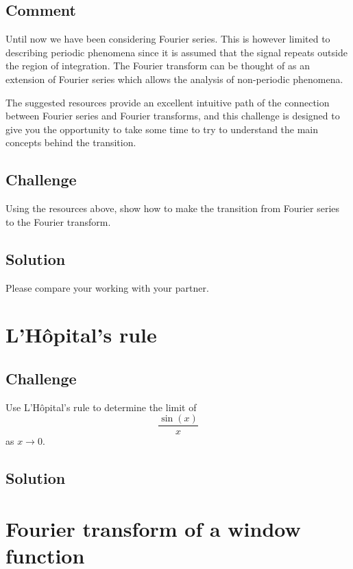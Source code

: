 \subsection*{Comment}
Until now we have been considering Fourier series. This is however limited to describing periodic phenomena since it is assumed that the signal repeats outside the region of integration. The Fourier transform can be thought of as an extension of Fourier series which allows the analysis of non-periodic phenomena.

The suggested resources provide an excellent intuitive path of the connection between Fourier series and Fourier transforms, and this challenge is designed to give you the opportunity to take some time to try to understand the main concepts behind the transition.

\subsection*{Challenge}
Using the resources above, show how to make the transition from Fourier series to the Fourier transform.

\subsection*{Solution}
Please compare your working with your partner.



\newpage
\section{L'H\^opital's rule}

\subsection*{Challenge}
Use L'H\^opital's rule to determine the limit of
\begin{equation}
    \frac{\sin(x)}{x}
\end{equation}
as $x \rightarrow 0$.

\subsection*{Solution}




\newpage
\section{Fourier transform of a window function}
\label{sec:tophat}

